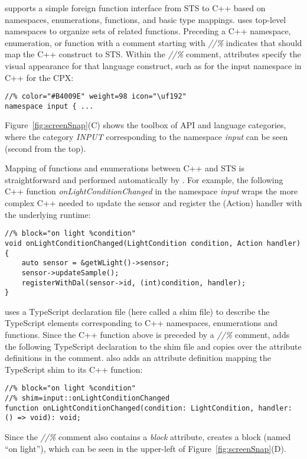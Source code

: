 \MC supports a simple foreign function interface from STS to C++ based on namespaces, enumerations, functions, and basic type mappings. \MC uses top-level namespaces to organize sets of related functions. Preceding a C++ namespace, enumeration, or function
with a comment starting with \emph{//\%} indicates that \MC should map the C++ construct to STS. 
Within the \emph{//\%} comment, attributes specify the visual appearance for that
language construct, such as for the input namespace in C++ for the CPX:

\begin{lstlisting}
//% color="#B4009E" weight=98 icon="\uf192"
namespace input { ...
\end{lstlisting}

Figure~\ref{fig:screenSnap}(C) shows the toolbox of API and language categories, where the
category \emph{INPUT} corresponding to the namespace \emph{input} can be seen (second
from the top).

Mapping of functions and enumerations between C++ and STS is straightforward
and performed automatically by \MCN.
For example, the following C++ function \emph{onLightConditionChanged}
in the namespace \emph{input}
wraps the more complex C++ needed to update the sensor and register the (Action)
handler with the underlying \CO runtime:
\begin{lstlisting}
//% block="on light %condition"
void onLightConditionChanged(LightCondition condition, Action handler) {
    auto sensor = &getWLight()->sensor;
    sensor->updateSample();
    registerWithDal(sensor->id, (int)condition, handler);
}
\end{lstlisting}

\MC uses a TypeScript declaration file (here called a shim file) to describe the TypeScript
elements corresponding to C++ namespaces, enumerations and functions.
Since the C++ function above is preceded by a \emph{//\%} comment,
\MC adds the following TypeScript declaration to the shim file and copies
over the attribute definitions in the comment. \MC also adds an attribute definition mapping
the TypeScript shim to its C++ function:

\begin{lstlisting}
//% block="on light %condition"
//% shim=input::onLightConditionChanged
function onLightConditionChanged(condition: LightCondition, handler: () => void): void;
\end{lstlisting}

Since the \emph{//\%} comment also contains a \emph{block} attribute, \MC creates a block (named ``on light''), which can be seen in the upper-left of Figure~\ref{fig:screenSnap}(D).

